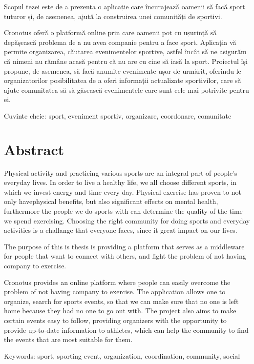   Scopul tezei este de a prezenta o aplicație care încurajează oamenii să facă sport
  tuturor și, de asemenea, ajută la construirea unei comunități de sportivi.
  
  Cronotus oferă o platformă online prin care oamenii pot cu ușurință
  să depășească problema de a nu avea companie pentru a face sport. Aplicația vă permite organizarea, căutarea evenimentelor sportive, 
  astfel încât să ne asigurăm că nimeni nu rămâne acasă pentru că nu are cu cine să iasă la sport. 
  Proiectul își propune, de asemenea, să facă anumite evenimente ușor de urmărit,
  oferindu-le organizatorilor posibilitatea de a oferi informații actualizate sportivilor, care să ajute comunitatea să
  să găsească evenimentele care sunt cele mai potrivite pentru ei.


\vfill
Cuvinte cheie: sport, eveniment sportiv, organizare, coordonare, comunitate
\clearpage
{}

\chapter*{Abstract}
Physical activity and practicing various sports are an integral part of people's everyday lives.
  In order to live a healthy life, we all choose different sports,
  in which we invest energy and time every day. Physical exercise has proven to not only havephysical benefits, but also significant effects on mental health,
  furthermore the people we do sports with can determine the quality of the time we spend exercising.\cite{warner2017yielding} Choosing the right community for doing sports and everyday 
  activities is a challange that everyone faces, since it great impact on our lives.
  
  The purpose of this is thesis is providing a platform that serves as a middleware for people that want to connect with others,
  and fight the problem of not having company to exercise.
  
  Cronotus provides an online platform where people can easily
  overcome the problem of not having company to exercise. The application allows one to organize, search for sports events,
  so that we can make sure that no one is left home because they had no one to go out with. 
  The project also aims to make certain events easy to follow,
  providing organizers with the opportunity to provide up-to-date information to athletes, which can help the community
  to find the events that are most suitable for them.

\vfill
Keywords: sport, sporting event, organization, coordination, community, social
\clearpage
\dolgozatnyelve
{}